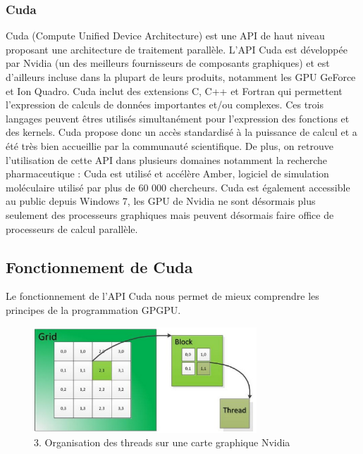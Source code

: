 \documentclass{report}
\begin{document}
\subsubsection{Cuda}
Cuda (Compute Unified Device Architecture) est une API de haut niveau proposant une architecture de traitement parallèle.\newline
L'API Cuda est développée par Nvidia (un des meilleurs fournisseurs de composants graphiques) et est d'ailleurs incluse dans la plupart de leurs produits, notamment les GPU GeForce et Ion Quadro.\newline
Cuda inclut des extensions C, C++ et Fortran qui permettent l'expression de calculs de données importantes et/ou complexes.\newline
Ces trois langages peuvent êtres utilisés simultanément pour l'expression des fonctions et des kernels.\newline
Cuda propose donc un accès standardisé à la puissance de calcul et a été très bien accueillie par la communauté scientifique. De plus, on retrouve l'utilisation de cette API dans plusieurs domaines notamment la recherche pharmaceutique : Cuda est utilisé et accélère Amber, logiciel de simulation moléculaire utilisé par plus de 60 000 chercheurs.\newline
Cuda est également accessible au public depuis Windows 7, les GPU de Nvidia ne sont désormais plus seulement des processeurs graphiques mais peuvent désormais faire office de processeurs de calcul parallèle.

\subsection{Fonctionnement de Cuda}
Le fonctionnement de l'API Cuda nous permet de mieux comprendre les principes de la programmation GPGPU. \newline

\begin{figure}[!h]
\begin{center}
\includegraphics[height=150]{image_cuda.png}
\end{center}
\caption{3. Organisation des threads sur une carte graphique Nvidia}
\label{test}
\end{figure} \newline
\end{document}

